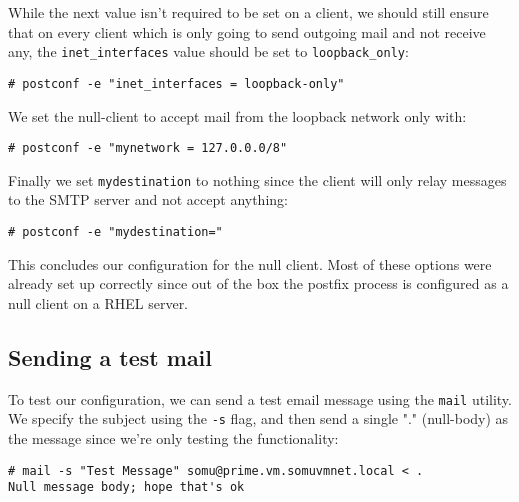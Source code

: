 \noindent
While the next value isn't required to be set on a client, we should still ensure that on every client which is only going to send outgoing mail and not receive any, the \verb|inet_interfaces| value should be set to \verb|loopback_only|:

\vspace{-15pt}
\begin{verbatim}
# postconf -e "inet_interfaces = loopback-only"
\end{verbatim}
\vspace{-10pt}	

\noindent
We set the null-client to accept mail from the loopback network only with:

\vspace{-15pt}
\begin{verbatim}
# postconf -e "mynetwork = 127.0.0.0/8"
\end{verbatim}
\vspace{-10pt}	

\noindent
Finally we set \verb|mydestination| to nothing since the client will only relay messages to the SMTP server and not accept anything:

\vspace{-15pt}
\begin{verbatim}
# postconf -e "mydestination="
\end{verbatim}
\vspace{-10pt}	

\noindent
This concludes our configuration for the null client. Most of these options were already set up correctly since out of the box the postfix process is configured as a null client on a RHEL server. 

\subsection{Sending a test mail}
To test our configuration, we can send a test email message using the \verb|mail| utility. We specify the subject using the \verb|-s| flag, and then send a single "." (null-body) as the message since we're only testing the functionality:

\vspace{-15pt}
\begin{verbatim}
# mail -s "Test Message" somu@prime.vm.somuvmnet.local < .
Null message body; hope that's ok
\end{verbatim}
\vspace{-10pt}	


